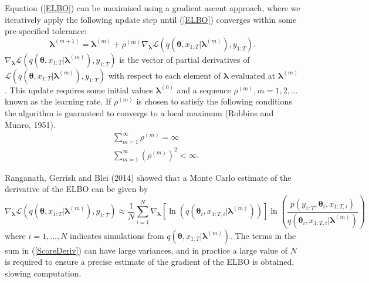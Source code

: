 \documentclass[12pt,a4paper]{article}%
\numberwithin{equation}{section}
\begin{document}
Equation (\ref{ELBO}) can be maximised using a gradient ascent approach, where we iteratively apply the following update step until (\ref{ELBO}) converges within some pre-specified tolerance:
\begin{equation}
\label{GradAscent}
\boldsymbol{\lambda}^{(m+1)} = \boldsymbol{\lambda}^{(m)} + \rho^{(m)} \nabla_{\boldsymbol{\lambda}} \mathcal{L}(q(\boldsymbol{\theta}, x_{1:T} | \boldsymbol{\lambda}^{(m)}), y_{1:T}).
\end{equation}
$\nabla_{\boldsymbol{\lambda}}\mathcal{L}(q(\boldsymbol{\theta}, x_{1:T} | \boldsymbol{\lambda}^{(m)}), y_{1:T})$ is the vector of partial derivatives of $\mathcal{L}(q(\boldsymbol{\theta}, x_{1:T} | \boldsymbol{\lambda}^{(m)}), y_{1:T})$ with respect to each element of $\boldsymbol{\lambda}$ evaluated at $\boldsymbol{\lambda}^{(m)}$. This update requires some initial values $\boldsymbol{\lambda}^{(0)}$ and a sequence $\rho^{(m)}, m = 1, 2, \dots$ known as the learning rate. If $\rho^{(m)}$ is chosen to satisfy the following conditions the algorithm is guaranteed to converge to a local maximum (Robbins and Munro, 1951).
\begin{align}
&\sum_{m=1}^{\infty} \rho^{(m)} =  \infty \\
&\sum_{m=1}^{\infty} (\rho^{(m)})^2 <  \infty.
\end{align}

Ranganath, Gerrish and Blei (2014) showed that a Monte Carlo estimate of the derivative of the ELBO can be given by
\begin{equation}
\label{ScoreDeriv}
\nabla_{\boldsymbol{\lambda}}\mathcal{L}(q(\boldsymbol{\theta}, x_{1:T} | \boldsymbol{\lambda}^{(m)}), y_{1:T}) \approx \frac{1}{N}\sum_{i=1}^{N} \nabla_{\boldsymbol{\lambda}} [\ln(q(\boldsymbol{\theta}_i, x_{1:T, i} | \boldsymbol{\lambda}^{(m)}))] \ln \left(\frac{p(y_{1:T}, \boldsymbol{\theta}_i, x_{1:T, i})}{q(\boldsymbol{\theta}_i, x_{1:T, i} | \boldsymbol{\lambda}^{(m)})} \right) 
\end{equation}
where $i = 1, \dots, N$ indicates simulations from $q(\boldsymbol{\theta}, x_{1:T} | \boldsymbol{\lambda}^{(m)})$. 
The terms in the sum in (\ref{ScoreDeriv}) can have large variances, and in practice a large value of $N$ is required to ensure a precise estimate of the gradient of the ELBO is obtained, slowing computation. 
\end{document}
